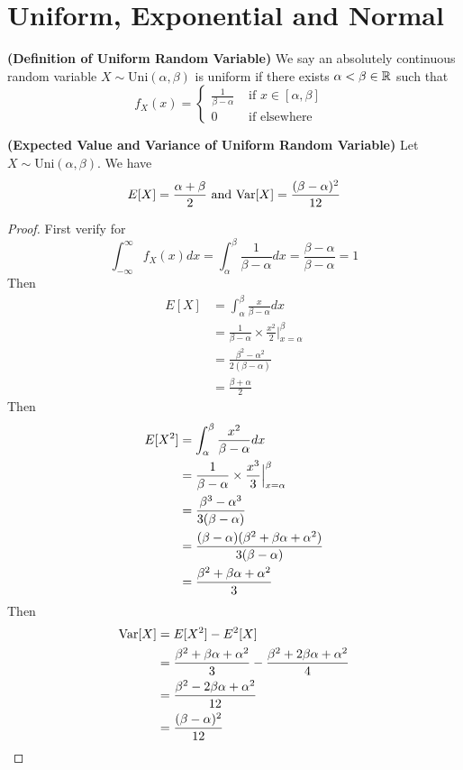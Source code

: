 \documentclass{report}
\begin{document}
\section{Uniform, Exponential and Normal}
\begin{definition}
\label{2.2.1}
\textbf{(Definition of Uniform Random Variable)} We say an absolutely continuous random variable $X\sim \text{Uni}(\alpha ,\beta )$ is uniform if there exists $\alpha <\beta \in\mathbb{R}$ such that
\begin{equation}
f_X(x)=\begin{cases}
\frac{1}{\beta -\alpha }& \text{ if $x\in [\alpha ,\beta ]$ }\\
0& \text{ if elsewhere }
\end{cases}
\end{equation}
\end{definition}
\begin{theorem}
\label{2.2.2}
\textbf{(Expected Value and Variance of Uniform Random Variable)} Let $X\sim \text{Uni}(\alpha ,\beta )$. We have
\begin{equation}
E[X]=\frac{\alpha +\beta }{2}\text{ and }\text{Var} [X]=\frac{(\beta -\alpha )^2}{12}
\end{equation}
\end{theorem}
\begin{proof}
First verify for
\begin{equation}
\int_{-\infty}^\infty f_X(x)dx=\int_{\alpha }^\beta \frac{1}{\beta -\alpha }dx=\frac{\beta -\alpha }{\beta -\alpha }=1
\end{equation}
Then 
\begin{align}
E[X]&=\int_{\alpha }^\beta \frac{x}{\beta -\alpha }dx\\
&=\frac{1}{\beta -\alpha }\times \frac{x^2}{2} \Big|_{x=\alpha }^\beta \\
&=\frac{\beta ^2-\alpha ^2}{2(\beta -\alpha )}\\
&=\frac{\beta +\alpha }{2}
\end{align}
Then 
\begin{align}
E[X^2]&=\int_{\alpha }^\beta \frac{x^2}{\beta -\alpha }dx\\
      &=\frac{1}{\beta -\alpha }\times \frac{x^3}{3} \Big |_{x=\alpha }^\beta\\
      &=\frac{\beta ^3-\alpha ^3}{3(\beta -\alpha )}\\
      &=\frac{(\beta -\alpha )(\beta ^2+\beta \alpha +\alpha ^2)}{3(\beta -\alpha )}\\
      &=\frac{\beta ^2+\beta \alpha +\alpha ^2}{3}
\end{align}
Then
\begin{align}
\text{Var} [X]&=E[X^2]-E^2[X]\\
&=\frac{\beta ^2+\beta \alpha +\alpha ^2}{3}-\frac{\beta ^2+2\beta \alpha +\alpha ^2}{4}\\
&=\frac{\beta^2-2\beta \alpha +\alpha ^2}{12}\\
&=\frac{(\beta -\alpha )^2}{12}
\end{align}
\end{proof}
\end{document}
